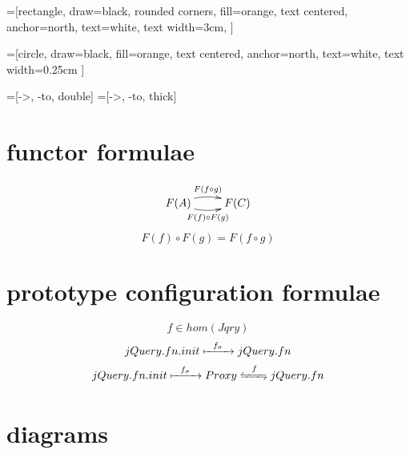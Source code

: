 \documentclass[11hpt]{article}
\begin{document}
=[rectangle, draw=black, rounded corners, fill=orange,
        text centered, anchor=north, text=white, text width=3cm, ]

=[circle, draw=black, fill=orange,
        text centered, anchor=north, text=white, text width=0.25cm ]

=[->, -to, double]
=[->, -to, thick]

\section{functor formulae}

\begin{equation} \label{eq:functor-arrows}
  \xymatrix{ F(A) \ar@/^/[r]^{F(f \circ g)} \ar@/_/[r]_{F(f) \circ F(g)} & F(C) }
\end{equation}
\begin{equation} \label{eq:functor-equate}
  F(f) \circ F(g) = F(f \circ g)
\end{equation}

\section{prototype configuration formulae}

\begin{equation}
 f \in hom(Jqry)
\end{equation}
\begin{equation} \label{eq:jquery-default}
 jQuery.fn.init \xmapsto{\ \ f_{\sigma}\ \ } jQuery.fn
\end{equation}
\begin{equation} \label{eq:jquery-with-proxy}
 jQuery.fn.init \xmapsto{\ \ f_{\sigma}\ \ } Proxy \xleftrightharpoons{\ \ f\ \ } jQuery.fn
\end{equation}

\section{diagrams}
\end{document}
